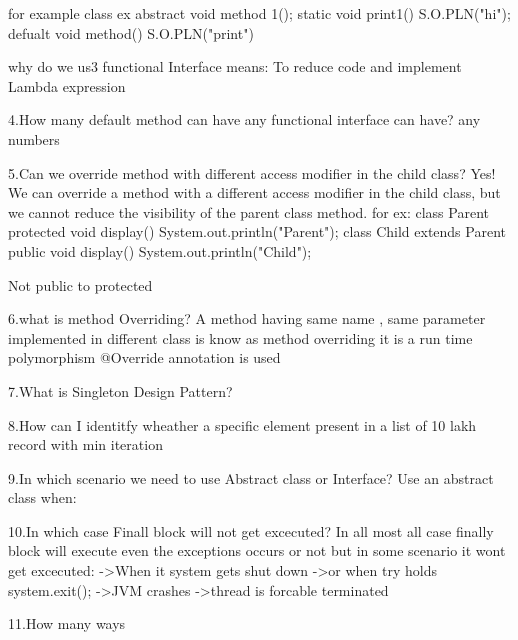 		for example
		class ex{
		abstract void method 1();
		static  void print1(){
		S.O.PLN("hi");}
		defualt void method(){
		S.O.PLN("print")}
		}
		
		why do we us3 functional Interface means:
			To reduce code and implement Lambda expression
			
4.How many default method can have any functional interface can have?
 any numbers
 
5.Can we override method with different access modifier in the child class?
	Yes! We can override a method with a different access modifier in the child class, but we cannot reduce the visibility of the parent class method.
	for ex:
	class Parent {
    protected void display() {
        System.out.println("Parent");
    }
    }
	class Child extends Parent {
    public void display() {
        System.out.println("Child");
    }
    }
	
	Not public to protected
	
6.what is method Overriding?
	A method having same name , same parameter implemented in different class is know as method overriding
	it is a run time polymorphism
	@Override annotation is used
	
7.What is Singleton Design Pattern?




8.How can I identitfy wheather a specific element present in a list of 10 lakh record with min iteration


9.In which scenario we need to use Abstract class or Interface?
	Use an abstract class when:
	
	
10.In which case Finall block will not get excecuted?
In all most all case finally block will execute even the exceptions occurs or not 
but in some scenario it wont get excecuted:
	->When it system gets shut down
	->or when try holds system.exit();
	->JVM crashes
	->thread is forcable terminated
	
11.How many ways


